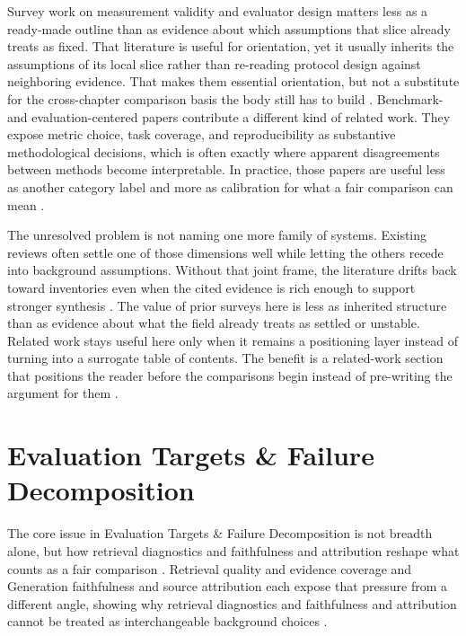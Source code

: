 \documentclass[a4paper,11pt]{article}
\begin{document}
Survey work on measurement validity and evaluator design matters less as a ready-made outline than as evidence about which assumptions that slice already treats as fixed. That literature is useful for orientation, yet it usually inherits the assumptions of its local slice rather than re-reading protocol design against neighboring evidence. That makes them essential orientation, but not a substitute for the cross-chapter comparison basis the body still has to build \citep{Murugaraj2025Ragvue,Nematov2025Source,SaadFalcon2023Ares,Upadhyay2026Overview}. Benchmark- and evaluation-centered papers contribute a different kind of related work. They expose metric choice, task coverage, and reproducibility as substantive methodological decisions, which is often exactly where apparent disagreements between methods become interpretable. In practice, those papers are useful less as another category label and more as calibration for what a fair comparison can mean \citep{Yao2026Authoritybench,An2026Fresco,Li2026Mrag,Guder2026Rage}.

The unresolved problem is not naming one more family of systems. Existing reviews often settle one of those dimensions well while letting the others recede into background assumptions. Without that joint frame, the literature drifts back toward inventories even when the cited evidence is rich enough to support stronger synthesis \citep{Brehme2025Retrieval,Packowski2024Optimizing,Muthyam2026Systems,Feng2026Rethinking}. The value of prior surveys here is less as inherited structure than as evidence about what the field already treats as settled or unstable. Related work stays useful here only when it remains a positioning layer instead of turning into a surrogate table of contents. The benefit is a related-work section that positions the reader before the comparisons begin instead of pre-writing the argument for them \citep{Su2025Dynamic,Bang2026Feedback,Cahoon2025Optimizing,Javadi2025Contradictions}.
\section{Evaluation Targets \& Failure Decomposition}


The core issue in Evaluation Targets \& Failure Decomposition is not breadth alone, but how retrieval diagnostics and faithfulness and attribution reshape what counts as a fair comparison \citep{Sun2026Robust,Kim2024Learning,Salemi2024Evaluating,Taiwo2026Evaluating}. Retrieval quality and evidence coverage and Generation faithfulness and source attribution each expose that pressure from a different angle, showing why retrieval diagnostics and faithfulness and attribution cannot be treated as interchangeable background choices \citep{Kovalskii2026Domain,Tian2026Predicting,Caruzzo2026Deceptive,Ding2026Attribution}.
\end{document}
